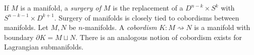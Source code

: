 
If $M$ is a manifold, a \emph{surgery of $M$} is the replacement of a $D^{n-k}\times S^k$ with $S^{n-k-1}\times D^{k+1}$. 
Surgery of manifolds is closely tied to cobordisms between manifolds. 
Let $M, N$ be $n$-manifolds. 
A \emph{cobordism} $K: M\rightsquigarrow N$ is a manifold with boundary $\partial K=M\sqcup N$. 
There is an analogous notion of cobordism exists for Lagrangian submanifolds.




